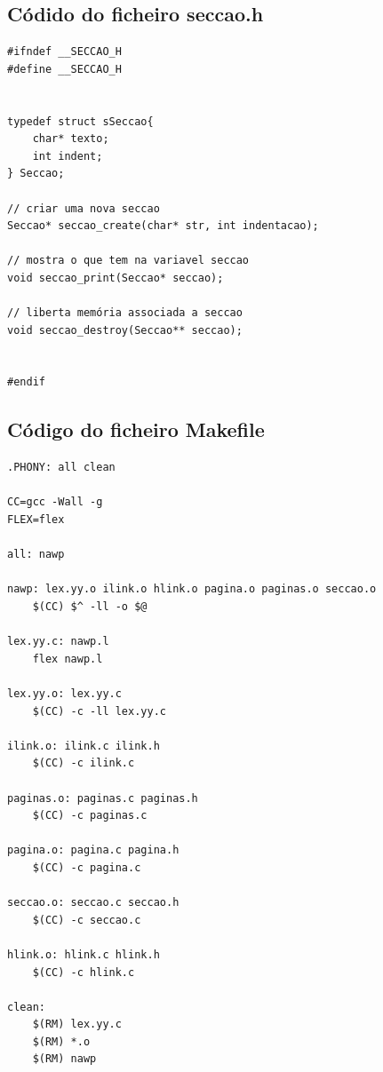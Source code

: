 \documentclass[11pt, a4paper, oneside]{article}
\begin{document}
\newpage
\subsection{Códido do ficheiro seccao.h}
\begin{verbatim}
#ifndef __SECCAO_H
#define __SECCAO_H


typedef struct sSeccao{
    char* texto;
    int indent;
} Seccao;

// criar uma nova seccao
Seccao* seccao_create(char* str, int indentacao);

// mostra o que tem na variavel seccao
void seccao_print(Seccao* seccao);

// liberta memória associada a seccao
void seccao_destroy(Seccao** seccao);


#endif

\end{verbatim}
\newpage

\subsection{Código do ficheiro Makefile}

\begin{verbatim}
.PHONY: all clean

CC=gcc -Wall -g
FLEX=flex

all: nawp

nawp: lex.yy.o ilink.o hlink.o pagina.o paginas.o seccao.o
	$(CC) $^ -ll -o $@

lex.yy.c: nawp.l
	flex nawp.l

lex.yy.o: lex.yy.c 
	$(CC) -c -ll lex.yy.c

ilink.o: ilink.c ilink.h
	$(CC) -c ilink.c

paginas.o: paginas.c paginas.h
	$(CC) -c paginas.c

pagina.o: pagina.c pagina.h
	$(CC) -c pagina.c

seccao.o: seccao.c seccao.h
	$(CC) -c seccao.c

hlink.o: hlink.c hlink.h
	$(CC) -c hlink.c

clean:
	$(RM) lex.yy.c
	$(RM) *.o
	$(RM) nawp

\end{verbatim}
\newpage
\end{document}
